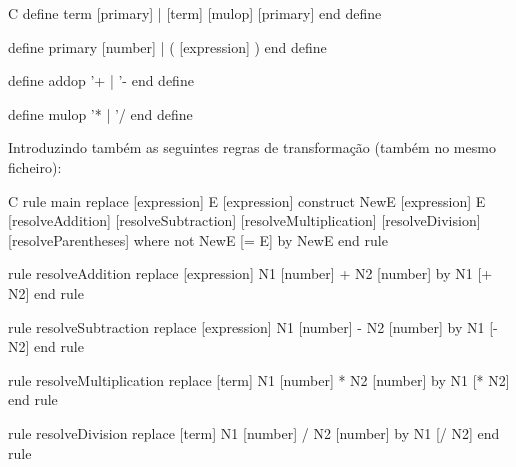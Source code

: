 \documentclass[runningheads,a4paper]{llncs}
\begin{document}
\begin{multicols}{2}
\begin{myCode}{C}
define term
        [primary]
    |   [term] [mulop] [primary]
end define 
                  
define primary
        [number]
    |   ( [expression] )
end define 
                  
define addop
        '+
    |   '-
end define 
                  
define mulop
        '*
    |   '/
end define 
\end{myCode}
Introduzindo também as seguintes regras de transformação (também no mesmo ficheiro):\\
\begin{myCode}{C}
rule main
    replace [expression]
        E [expression]
    construct NewE [expression]
        E [resolveAddition] [resolveSubtraction]
          [resolveMultiplication] [resolveDivision]
          [resolveParentheses]
    where not
        NewE [= E]
    by
        NewE
end rule                  
                  
rule resolveAddition
    replace [expression]
        N1 [number] + N2 [number]
    by
        N1 [+ N2]
end rule 
                  
rule resolveSubtraction
    replace [expression]
        N1 [number] - N2 [number]
    by
        N1 [- N2]
end rule

rule resolveMultiplication
    replace [term]
        N1 [number] * N2 [number]
    by
        N1 [* N2]
end rule                  

rule resolveDivision
    replace [term]
        N1 [number] / N2 [number]
    by
        N1 [/ N2]
end rule                  


\end{myCode}
\end{multicols}
\end{document}
